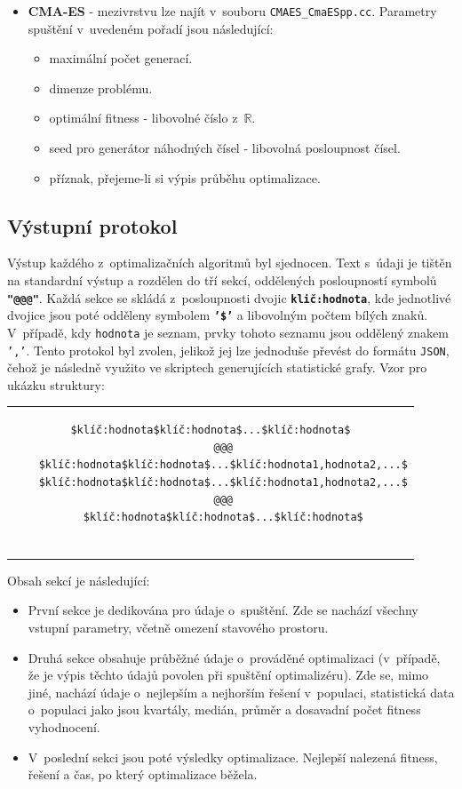 \begin{itemize}
    \item \textbf{CMA-ES} - mezivrstvu lze najít v~souboru \texttt{CMAES\_CmaESpp.cc}. Parametry spuštění v~uvedeném pořadí jsou následující:
\begin{itemize}
    \item maximální počet generací.
    \item dimenze problému.
    \item optimální fitness - libovolné číslo z~$\mathbb{R}$.
    \item seed pro generátor náhodných čísel - libovolná posloupnost čísel.
    \item příznak, přejeme-li si výpis průběhu optimalizace.
\end{itemize}
\noindent 
\end{itemize}
\subsection{Výstupní protokol}
Výstup každého z~optimalizačních algoritmů byl sjednocen. Text s~údaji je tištěn na standardní výstup a rozdělen do tří sekcí, oddělených posloupností symbolů \textbf{\texttt{"@@@"}}. Každá sekce se skládá z~posloupnosti dvojic \textbf{\texttt{klič:hodnota}}, kde jednotlivé dvojice jsou poté odděleny symbolem \textbf{\texttt{'\$'}} a libovolným počtem bílých znaků. V~případě, kdy \texttt{hodnota} je seznam, prvky tohoto seznamu jsou oddělený znakem \texttt{','}. Tento protokol byl zvolen, jelikož jej lze jednoduše převést do formátu \texttt{JSON}, čehož je následně využito ve skriptech generujících statistické grafy. Vzor pro ukázku struktury:

\begin{center}
\begin{tabular}{c}
\begin{lstlisting}[breaklines]
    $klíč:hodnota$klíč:hodnota$...$klíč:hodnota$
    @@@
    $klíč:hodnota$klíč:hodnota$...$klíč:hodnota1,hodnota2,...$
    $klíč:hodnota$klíč:hodnota$...$klíč:hodnota1,hodnota2,...$
    @@@
    $klíč:hodnota$klíč:hodnota$...$klíč:hodnota$
  
\end{lstlisting}
\end{tabular}
\end{center}
Obsah sekcí je následující:
\begin{itemize}
    \item První sekce je dedikována pro údaje o~spuštění. Zde se nachází všechny vstupní parametry, včetně omezení stavového prostoru.
    \item Druhá sekce obsahuje průběžné údaje o~prováděné optimalizaci (v~případě, že je výpis těchto údajů povolen při spuštění optimalizéru). Zde se, mimo jiné, nachází údaje o~nejlepším a nejhorším řešení v~populaci, statistická data o~populaci jako jsou kvartály, medián, průměr a dosavadní počet fitness vyhodnocení.
    \item V~poslední sekci jsou poté výsledky optimalizace. Nejlepší nalezená fitness, řešení a čas, po který optimalizace běžela.
\end{itemize}


